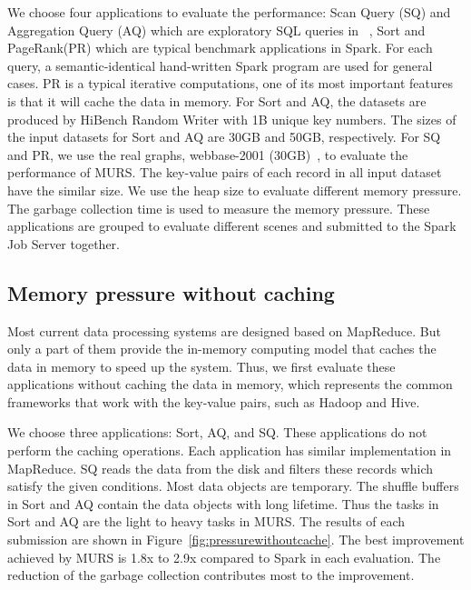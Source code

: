 We choose four applications to evaluate the performance: Scan Query (SQ) and Aggregation Query (AQ) which are exploratory SQL queries in ~\cite{www:benchmark}, Sort and  PageRank(PR) which are typical benchmark applications in Spark. For each query, a semantic-identical hand-written Spark program are used for general cases. PR is a typical iterative computations, one of its most important features is that it will cache the data in memory. 
For Sort and AQ, the datasets are produced by HiBench Random Writer with 1B unique key numbers. The sizes of the input datasets for Sort and AQ are 30GB and 50GB, respectively. For SQ and PR, we use the real graphs, webbase-2001 (30GB)~\cite{boldi:webgraph}, to evaluate the performance of MURS. The key-value pairs of each record in all input dataset have the similar size. We use the heap size to evaluate different memory pressure. The garbage collection time is used to measure the memory pressure. These applications are grouped to evaluate different scenes and submitted to the Spark Job Server together.

\subsection{Memory pressure without caching}

Most current data processing systems are designed based on MapReduce. But only a part of them provide the in-memory computing model that caches the data in memory to speed up the system. Thus, we first evaluate these applications without caching the data in memory, which represents the common frameworks that work with the key-value pairs, such as Hadoop and Hive.

We choose three applications: Sort, AQ, and SQ. These applications do not perform the caching operations. Each application has similar implementation in MapReduce. SQ reads the data from the disk and filters these records which satisfy the given conditions. Most data objects are temporary. The shuffle buffers in Sort and AQ contain the data objects with long lifetime. Thus the tasks in Sort and AQ are the light to heavy tasks in MURS. The results of each submission are shown in Figure~\ref{fig:pressurewithoutcache}. The best improvement achieved by MURS is 1.8x to 2.9x compared to Spark in each evaluation. The reduction of the garbage collection contributes most to the improvement.

